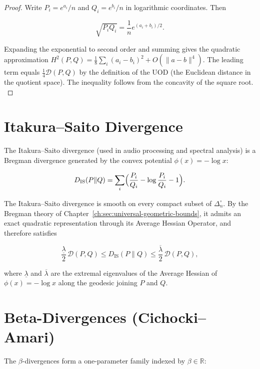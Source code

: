 \begin{proof}
Write \(P_i=e^{a_i}/n\) and \(Q_i=e^{b_i}/n\) in logarithmic coordinates.
Then

\[
\sqrt{P_iQ_i}=\frac1n e^{(a_i+b_i)/2}.
\]

Expanding the exponential to second order and summing gives the
quadratic approximation
\(H^2(P,Q)=\frac18\sum_i(a_i-b_i)^2+O(\|a-b\|^4)\).
The leading term equals \(\frac14\mathcal D(P,Q)\) by the definition
of the UOD (the Euclidean distance in the quotient space).  The
inequality follows from the concavity of the square root.
\(\)
\end{proof}

\section{Itakura--Saito Divergence}\label{ch:sec:itakura--saito-divergence}

The Itakura--Saito divergence \cite{sakamoto2008reversible} (used in audio processing and spectral
analysis) is a Bregman divergence generated by the convex potential
\(\phi(x)=-\log x\):

\[
D_{\mathrm{IS}}(P\|Q) = \sum_i
\Bigl(
\frac{P_i}{Q_i} - \log\frac{P_i}{Q_i} - 1
\Bigr).
\]

\begin{corollary}
\label{ch:cor:is}
The Itakura--Saito divergence is smooth on every compact subset of
\(\Delta_n^\circ\).  By the Bregman theory of Chapter~\ref{ch:sec:universal-geometric-bounds}, it admits an
exact quadratic representation through its Average Hessian Operator,
and therefore satisfies

\[
\frac{\underline\lambda}{2}\,\mathcal D(P,Q)
\le
D_{\mathrm{IS}}(P\|Q)
\le
\frac{\overline\lambda}{2}\,\mathcal D(P,Q),
\]

where \(\underline\lambda\) and \(\overline\lambda\) are the extremal
eigenvalues of the Average Hessian of \(\phi(x)=-\log x\) along the
geodesic joining \(P\) and \(Q\).
\end{corollary}

\section{Beta-Divergences (Cichocki--Amari)}\label{ch:sec:beta-divergences-cichocki--amari}

The \(\beta\)-divergences \cite{cichocki2010families} form a
one-parameter family indexed by \(\beta\in\mathbb R\):

